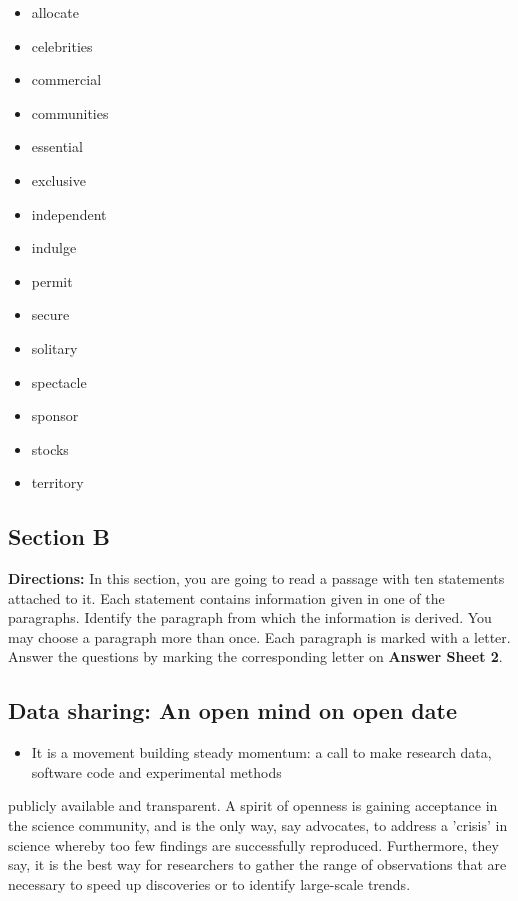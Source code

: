 \documentclass[UTF8,11pt]{ctexart}
\begin{document}
\begin{itemize}[leftmargin=2em,itemsep=.2em,topsep=.4em]\item[A.] allocate
\item[B.] celebrities
\item[C.] commercial
\item[D.] communities
\item[E.] essential
\item[F.] exclusive
\item[G.] independent
\item[H.] indulge
\item[I.] permit
\item[J.] secure
\item[K.] solitary
\item[L.] spectacle
\item[M.] sponsor
\item[N.] stocks
\item[O.] territory
\end{itemize}

\subsection*{\textbf{Section B}}


\textbf{Directions:} In this section, you are going to read a passage with ten statements attached to it. Each statement contains information given in one of the paragraphs. Identify the paragraph from which the information is derived. You may choose a paragraph more than once. Each paragraph is marked with a letter. Answer the questions by marking the corresponding letter on\textbf{ Answer Sheet 2}.


\subsection*{\textbf{Data sharing: An open mind on open date}}


\begin{itemize}[leftmargin=2em,itemsep=.2em,topsep=.4em]\item[A.] It is a movement building steady momentum: a call to make research data, software code and experimental methods
\end{itemize}

publicly available and transparent. A spirit of openness is gaining acceptance in the science community, and is the only way, say advocates, to address a 'crisis' in science whereby too few findings are successfully reproduced. Furthermore, they say, it is the best way for researchers to gather the range of observations that are necessary to speed up discoveries or to identify large-scale trends.
\end{document}
